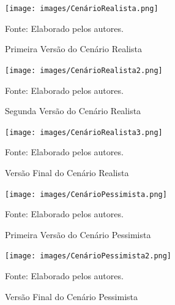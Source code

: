\documentclass[
    12pt,               %
    openright,          %
    oneside,
    a4paper,            %
    BIBLATEX,           %
    TODO,               %
    english,            %
    brazil              %
    ]{ifsp-spo-inf-ctds}
\begin{document}
            \begin{figure}[H]
                \centering
                 \caption{Primeira Versão do Cenário Realista}
                \texttt{[image: images/CenárioRealista.png]}

                \label{fig:cenariorealistaGrafico1}
                \centering
            \footnotesize Fonte: Elaborado pelos autores.
            \end{figure}

            \begin{figure}[H]
                \centering
                \caption{Segunda Versão do Cenário Realista}
                \texttt{[image: images/CenárioRealista2.png]}

                \label{fig:cenariorealistaGrafico2}
                \centering
            \footnotesize Fonte: Elaborado pelos autores.
            \end{figure}

            \begin{figure}[H]
                \centering
                \caption{Versão Final do Cenário Realista}
                \texttt{[image: images/CenárioRealista3.png]}

                \label{fig:cenariorealistaGrafico3}
                \centering
            \footnotesize Fonte: Elaborado pelos autores.
            \end{figure}

            
            \begin{figure}[H]
                \centering
                \caption{Primeira Versão do Cenário Pessimista}
                \texttt{[image: images/CenárioPessimista.png]}

                \label{fig:cenarioPessimistaGrafico}
                \centering
            \footnotesize Fonte: Elaborado pelos autores.
            \end{figure}

            \begin{figure}[H]
                \centering
                \caption{Versão Final do Cenário Pessimista}
                \texttt{[image: images/CenárioPessimista2.png]}

                \label{fig:cenarioPessimistaGrafico1}
                \centering
            \footnotesize Fonte: Elaborado pelos autores.
            \end{figure}
\end{document}
